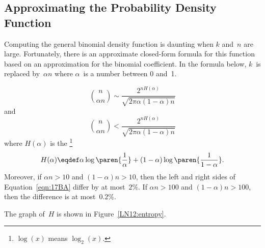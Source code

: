 \subsection{Approximating the Probability Density Function}

Computing the general binomial density function is daunting when $k$
and~$n$ are large.  Fortunately, there is an approximate closed-form
formula for this function based on an approximation for the binomial
coefficient.  In the formula below, $k$~is replaced by~$\alpha n$
where $\alpha$~is a number between 0 and~1.
%
\begin{lemma}\label{LN12:bincoeff-bound}
\begin{equation}\label{eqn:17BA}
\binom{n}{\alpha n}
        \sim \frac{2^{n H(\alpha)}}{\sqrt{2 \pi \alpha (1 - \alpha) n}}
\end{equation}
and
\begin{equation}\label{eqn:17A3}
\binom{n}{\alpha n} < \frac{ 2^{n H(\alpha)} }
                           { \sqrt{2 \pi \alpha (1 - \alpha) n} }
\end{equation}
where $H(\alpha)$ is the \footnote{$\log(x)$
  means $\log_2(x)$.}
\begin{equation*}
H(\alpha) \eqdef \alpha \log\paren{\frac{1}{\alpha}} +
                (1 - \alpha) \log\paren{\frac{1}{1 - \alpha}}.
\end{equation*}
Moreover, if $\alpha n > 10$ and $(1 - \alpha) n > 10$, then the left
and right sides of Equation~\ref{eqn:17BA} differ by at most~$2\%$.  If
$\alpha n > 100$ and $(1 - \alpha) n > 100$, then the difference is at
most~$0.2\%$.
\end{lemma}

The graph of~$H$ is shown in Figure~\ref{LN12:entropy}.

